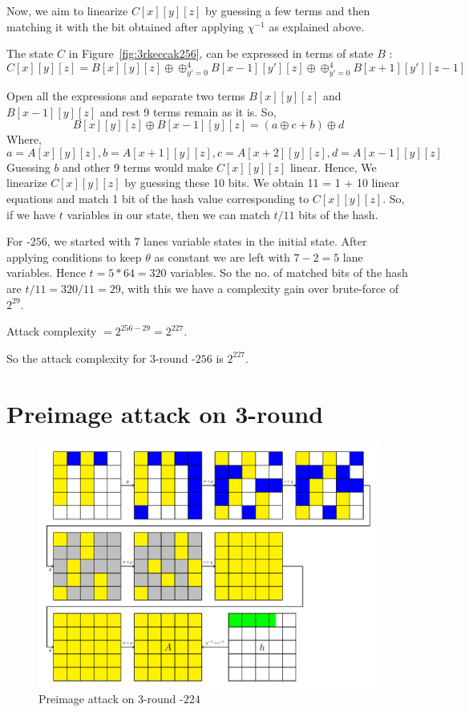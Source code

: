 Now, we aim to linearize $C[x][y][z]$ by guessing a few terms and then matching it with the bit obtained after applying $\chi^{-1}$ as explained above.

The state $C$ in Figure~\ref{fig:3rkeccak256}, can be expressed in terms of state $B$ :
\[
    C[x][y][z] = B[x][y][z] \oplus \oplus_{y' = 0}^{4} B[x-1][y'][z] \oplus \oplus_{y' = 0}^{4} B[x+1][y'][z-1]
\]

Open all the expressions and separate two terms $B[x][y][z]$ and $B[x-1][y][z]$ and rest 9 terms remain as it is.
So, \[ B[x][y][z] \oplus B[x-1][y][z] = (a \oplus c + b) \oplus d
    \]
Where,
\[
    a = A[x][y][z], b = A[x + 1][y][z], c = A[x + 2][y][z], d = A[x - 1][y][z]
\]
Guessing $b$ and other 9 terms would make $C[x][y][z]$ linear. Hence, We linearize $C[x][y][z]$ by guessing these 10 bits. We obtain 11 = 1 + 10 linear equations and match 1 bit of the hash value corresponding to $C[x][y][z]$. So, if we have $t$ variables in our state, then we can match $t/11$ bits of the hash.

For \Keccak-$256$, we started with $7$ lanes variable states in the initial state. After applying conditions to keep $\theta$ as constant we are left with $7 - 2 = 5$ lane variables. Hence $t = 5*64 = 320$ variables.
So the no. of matched bits of the hash are $t/11 = 320/11 = 29$, with this we have a complexity gain over brute-force of $2^{29}$.

Attack complexity $ = 2^{256 - 29} = 2^{227}$.

So the attack complexity for 3-round \KECCAK{}-$256$ is $2^{227}$.

\section{Preimage attack on 3-round }

\begin{figure}[H]
	\includegraphics[scale=0.7]{3R,Keccak-224.pdf}
	\caption{Preimage attack on 3-round \KECCAK-$224$}
	\label{fig:3rkeccak224}
\end{figure}

